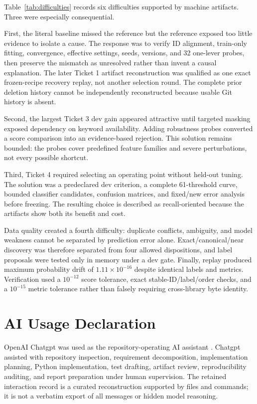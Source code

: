\documentclass[conference]{IEEEtran}
\begin{document}
Table~\ref{tab:difficulties} records six difficulties supported by machine artifacts. Three were especially consequential.

First, the literal baseline missed the reference but the reference exposed too little evidence to isolate a cause. The response was to verify ID alignment, train-only fitting, convergence, effective settings, seeds, versions, and 32 one-lever probes, then preserve the mismatch as unresolved rather than invent a causal explanation. The later Ticket 1 artifact reconstruction was qualified as one exact frozen-recipe recovery replay, not another selection round. The complete prior deletion history cannot be independently reconstructed because usable Git history is absent.

Second, the largest Ticket 3 dev gain appeared attractive until targeted masking exposed dependency on keyword availability. Adding robustness probes converted a score comparison into an evidence-based rejection. This solution remains bounded: the probes cover predefined feature families and severe perturbations, not every possible shortcut.

Third, Ticket 4 required selecting an operating point without held-out tuning. The solution was a predeclared dev criterion, a complete 61-threshold curve, bounded classifier candidates, confusion matrices, and fixed/new error analysis before freezing. The resulting choice is described as recall-oriented because the artifacts show both its benefit and cost.

Data quality created a fourth difficulty: duplicate conflicts, ambiguity, and model weakness cannot be separated by prediction error alone. Exact/canonical/near discovery was therefore separated from four allowed dispositions, and label proposals were tested only in memory under a dev gate. Finally, replay produced maximum probability drift of $1.11\times10^{-16}$ despite identical labels and metrics. Verification used a $10^{-12}$ score tolerance, exact stable-ID/label/order checks, and a $10^{-15}$ metric tolerance rather than falsely requiring cross-library byte identity.



\section{AI Usage Declaration}

OpenAI Chatgpt was used as the repository-operating AI assistant \cite{openai-codex}. Chatgpt assisted with repository inspection, requirement decomposition, implementation planning, Python implementation, test drafting, artifact review, reproducibility auditing, and report preparation under human supervision. The retained interaction record is a curated reconstruction supported by files and commands; it is not a verbatim export of all messages or hidden model reasoning.
\end{document}
